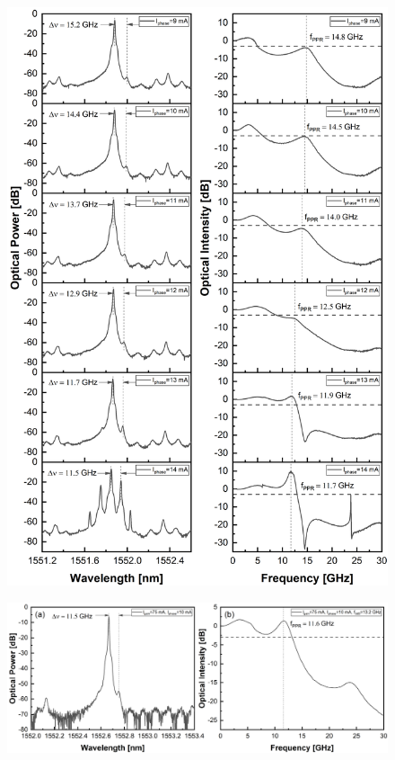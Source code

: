 

\begin{figure}[!htb]
    \centering
    \includegraphics[width=\linewidth]{figures/spectra_and_bandwidth_6559.png}
    \caption{}
    \label{fig:spectra_and_bandwidth_6559}
\end{figure}

\begin{figure}[!htb]
    \centering
    \includegraphics[width=\linewidth]{figures/spectrum_and_bandwidth_6557.png}
    \caption{}
    \label{fig:spectra_and_bandwidth_6557}
\end{figure}

